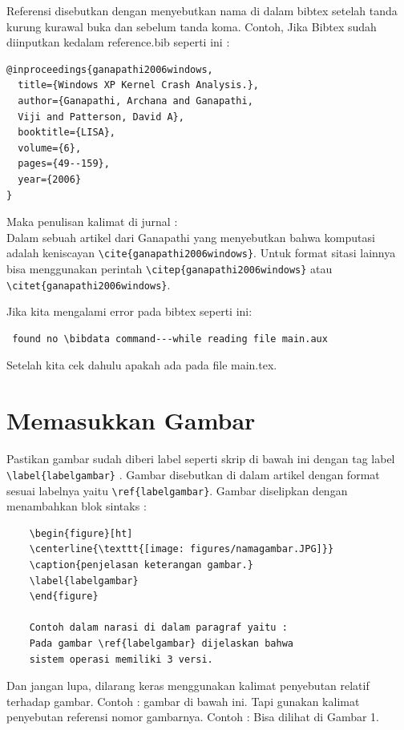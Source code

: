 Referensi disebutkan dengan menyebutkan nama di dalam bibtex setelah tanda kurung kurawal buka dan sebelum tanda koma. Contoh, Jika Bibtex sudah diinputkan kedalam reference.bib seperti ini :
\begin{verbatim}
@inproceedings{ganapathi2006windows,
  title={Windows XP Kernel Crash Analysis.},
  author={Ganapathi, Archana and Ganapathi, 
  Viji and Patterson, David A},
  booktitle={LISA},
  volume={6},
  pages={49--159},
  year={2006}
}
\end{verbatim}
Maka penulisan kalimat di jurnal : \\
Dalam sebuah artikel dari Ganapathi yang 
menyebutkan bahwa komputasi adalah keniscayan \verb|\cite{ganapathi2006windows}|. Untuk format sitasi lainnya bisa menggunakan perintah \verb|\citep{ganapathi2006windows}| atau \verb|\citet{ganapathi2006windows}|.

Jika kita mengalami error pada bibtex seperti ini:
\begin{verbatim}
 found no \bibdata command---while reading file main.aux
\end{verbatim}
Setelah kita cek dahulu apakah ada \verb|| pada file main.tex.

	
	
\section{Memasukkan Gambar}

Pastikan gambar sudah diberi label seperti skrip di bawah ini dengan tag label \verb|\label{labelgambar}| . Gambar disebutkan di dalam artikel dengan format sesuai labelnya yaitu \verb|\ref{labelgambar}|. Gambar diselipkan dengan menambahkan blok sintaks :
    \begin{verbatim}
    \begin{figure}[ht]
    \centerline{\texttt{[image: figures/namagambar.JPG]}}
    \caption{penjelasan keterangan gambar.}
    \label{labelgambar}
    \end{figure}
    
   	Contoh dalam narasi di dalam paragraf yaitu :
    Pada gambar \ref{labelgambar} dijelaskan bahwa 
    sistem operasi memiliki 3 versi.
    \end{verbatim}

Dan jangan lupa, dilarang keras menggunakan kalimat penyebutan relatif terhadap gambar. Contoh : gambar di bawah ini. Tapi gunakan kalimat penyebutan referensi nomor gambarnya. Contoh : Bisa dilihat di Gambar 1.

